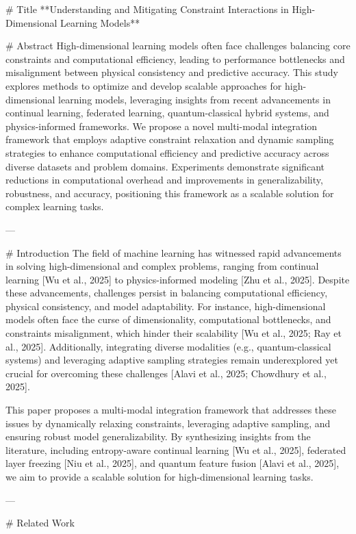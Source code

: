# Title  
**Understanding and Mitigating Constraint Interactions in High-Dimensional Learning Models**

# Abstract  
High-dimensional learning models often face challenges balancing core constraints and computational efficiency, leading to performance bottlenecks and misalignment between physical consistency and predictive accuracy. This study explores methods to optimize and develop scalable approaches for high-dimensional learning models, leveraging insights from recent advancements in continual learning, federated learning, quantum-classical hybrid systems, and physics-informed frameworks. We propose a novel multi-modal integration framework that employs adaptive constraint relaxation and dynamic sampling strategies to enhance computational efficiency and predictive accuracy across diverse datasets and problem domains. Experiments demonstrate significant reductions in computational overhead and improvements in generalizability, robustness, and accuracy, positioning this framework as a scalable solution for complex learning tasks.  

---

# Introduction  
The field of machine learning has witnessed rapid advancements in solving high-dimensional and complex problems, ranging from continual learning [Wu et al., 2025] to physics-informed modeling [Zhu et al., 2025]. Despite these advancements, challenges persist in balancing computational efficiency, physical consistency, and model adaptability. For instance, high-dimensional models often face the curse of dimensionality, computational bottlenecks, and constraints misalignment, which hinder their scalability [Wu et al., 2025; Ray et al., 2025]. Additionally, integrating diverse modalities (e.g., quantum-classical systems) and leveraging adaptive sampling strategies remain underexplored yet crucial for overcoming these challenges [Alavi et al., 2025; Chowdhury et al., 2025].

This paper proposes a multi-modal integration framework that addresses these issues by dynamically relaxing constraints, leveraging adaptive sampling, and ensuring robust model generalizability. By synthesizing insights from the literature, including entropy-aware continual learning [Wu et al., 2025], federated layer freezing [Niu et al., 2025], and quantum feature fusion [Alavi et al., 2025], we aim to provide a scalable solution for high-dimensional learning tasks.  

---

# Related Work  

